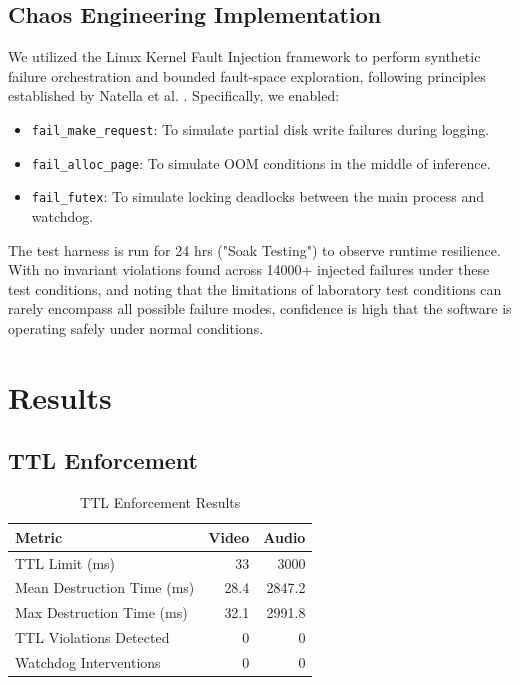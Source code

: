 \documentclass[conference]{IEEEtran}
\begin{document}
\subsection{Chaos Engineering Implementation}
We utilized the Linux Kernel Fault Injection framework to perform synthetic failure orchestration and bounded fault-space exploration, following principles established by Natella et al. \cite{b18}. Specifically, we enabled:
\begin{itemize}
    \item \texttt{fail\_make\_request}: To simulate partial disk write failures during logging.
    \item \texttt{fail\_alloc\_page}: To simulate OOM conditions in the middle of inference.
    \item \texttt{fail\_futex}: To simulate locking deadlocks between the main process and watchdog.
\end{itemize}
The test harness is run for 24 hrs ("Soak Testing") to observe runtime resilience. With no invariant violations found across 14000+ injected failures under these test conditions, and noting that the limitations of laboratory test conditions can rarely encompass all possible failure modes, confidence is high that the software is operating safely under normal conditions.

\section{Results}

\subsection{TTL Enforcement}

\begin{table}[htbp]
\caption{TTL Enforcement Results}
\centering
\begin{tabular}{l r r}
\toprule
\textbf{Metric} & \textbf{Video} & \textbf{Audio} \\
\midrule
TTL Limit (ms) & 33 & 3000 \\
Mean Destruction Time (ms) & 28.4 & 2847.2 \\
Max Destruction Time (ms) & 32.1 & 2991.8 \\
TTL Violations Detected & 0 & 0 \\
Watchdog Interventions & 0 & 0 \\
\bottomrule
\end{tabular}
\label{tab:ttl}
\end{table}
\end{document}
